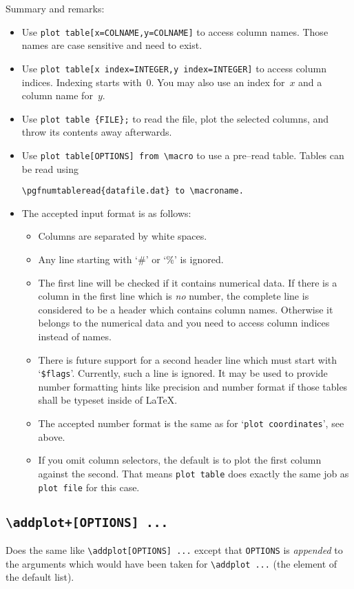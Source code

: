 Summary and remarks:
\begin{itemize}
	\item Use \texttt{plot table[x=COLNAME,y=COLNAME]} to access column names. Those names are case sensitive and need to exist.
	\item Use \texttt{plot table[x index=INTEGER,y index=INTEGER]} to access column indices. Indexing starts with~$0$. You may also use an index for~$x$ and a column name for~$y$.
	\item Use \lstinline!plot table {FILE};! to read the file, plot the selected columns, and throw its contents away afterwards.
	\item Use \lstinline!plot table[OPTIONS] from \macro! to use a pre--read table. Tables can be read using
\begin{lstlisting}
\pgfnumtableread{datafile.dat} to \macroname.
\end{lstlisting}
	\item The accepted input format is as follows:
		\begin{itemize}
			\item Columns are separated by white spaces.
			\item Any line starting with `\#' or `\%' is ignored.
			\item The first line will be checked if it contains numerical data. If there is a column in the first line which is \emph{no} number, the complete line is considered to be a header which contains column names. Otherwise it belongs to the numerical data and you need to access column indices instead of names.

			\item There is future support for a second header line which must start with `\texttt{\$flags}'. Currently, such a line is ignored. It may be used to provide number formatting hints like precision and number format if those tables shall be typeset inside of \LaTeX.
			\item The accepted number format is the same as for `\texttt{plot coordinates}', see above.
			\item If you omit column selectors, the default is to plot the first column against the second. That means \texttt{plot table} does exactly the same job as \texttt{plot file} for this case.
		\end{itemize}
\end{itemize}

\subsection{\texttt{\textbackslash addplot+[OPTIONS] ...}}
Does the same like \lstinline!\addplot[OPTIONS] ...! except that \texttt{OPTIONS} is \emph{appended} to the arguments which would have been taken for \lstinline!\addplot ...! (the element of the default list).

